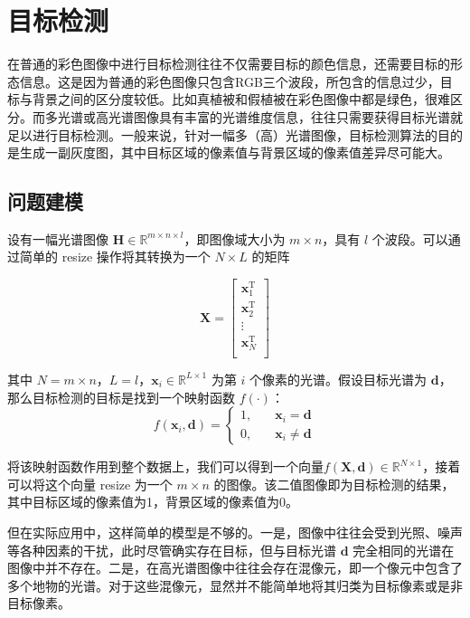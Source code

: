 \section{目标检测}
在普通的彩色图像中进行目标检测往往不仅需要目标的颜色信息，还需要目标的形态信息。这是因为普通的彩色图像只包含RGB三个波段，所包含的信息过少，目标与背景之间的区分度较低。比如真植被和假植被在彩色图像中都是绿色，很难区分。而多光谱或高光谱图像具有丰富的光谱维度信息，往往只需要获得目标光谱就足以进行目标检测。一般来说，针对一幅多（高）光谱图像，目标检测算法的目的是生成一副灰度图，其中目标区域的像素值与背景区域的像素值差异尽可能大。

\subsection{问题建模}
设有一幅光谱图像 \(\mathbf{H} \in \mathbb{R}^{m \times n \times l}\)，即图像域大小为 \(m\times n\)，具有 \(l\) 个波段。可以通过简单的 resize 操作将其转换为一个 \(N \times L\) 的矩阵

\begin{equation}
    \mathbf{X} = \begin{bmatrix}
        \mathbf{x}_{1}^{\mathrm{T}} \\ 
        \mathbf{x}_{2}^{\mathrm{T}} \\ 
        \vdots                      \\ 
        \mathbf{x}_{N}^{\mathrm{T}} \\ 
    \end{bmatrix}
\end{equation}

其中 \(N=m \times n\)，\(L=l\)，\(\mathbf{x}_{i} \in \mathbb{R}^{L \times 1}\) 为第 \(i\) 个像素的光谱。假设目标光谱为 \(\mathbf{d}\)，那么目标检测的目标是找到一个映射函数 \(f(\cdot)\)：
\begin{equation}
    f(\mathbf{x}_{i}, \mathbf{d}) = \left\{
    \begin{aligned}
        1, & \quad \mathbf{x}_{i} = \mathbf{d}    \\ 
        0, & \quad \mathbf{x}_{i} \neq \mathbf{d}
    \end{aligned} \right.
\end{equation}

将该映射函数作用到整个数据上，我们可以得到一个向量\(f(\mathbf{X}, \mathbf{d}) \in \mathbb{R}^{N \times 1}\)，接着可以将这个向量 resize 为一个 \(m \times n\) 的图像。该二值图像即为目标检测的结果，其中目标区域的像素值为1，背景区域的像素值为0。

但在实际应用中，这样简单的模型是不够的。一是，图像中往往会受到光照、噪声等各种因素的干扰，此时尽管确实存在目标，但与目标光谱 \(\mathbf{d}\) 完全相同的光谱在图像中并不存在。二是，在高光谱图像中往往会存在混像元，即一个像元中包含了多个地物的光谱。对于这些混像元，显然并不能简单地将其归类为目标像素或是非目标像素。

